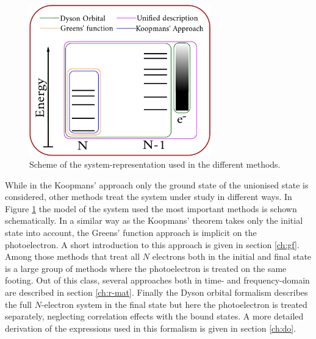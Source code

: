 {\begin{figure}
   \includegraphics[width=0.7\textwidth]{Figures/Methods}
   \caption{Scheme of the system-representation used in the different methods.}
   \label{fig:PEScat}
\end{figure}
While in the Koopmans' approach only the ground state of the un\-ion\-ised state is considered, other methods treat the system under study in different ways.
In Figure \ref{fig:PEScat} the model of the system used the most important methods is schown schematically.
In a similar way as the Koopmans' theorem takes only the initial state into account, the Greens' function approach is implicit on the photoelectron.
A short introduction to this approach is given in section \ref{ch:gf}.
Among those methods that treat all $N$ electrons both in the initial and final state is a large group of methods where the photoelectron is treated on the same footing.
Out of this class, several approaches both in time- and frequency-domain are described in section \ref{ch:r-mat}.
Finally the Dyson orbital formalism describes the full $N$-electron system in the final state but here the photoelectron is treated separately, neglecting correlation effects with the bound states.
A more detailed derivation of the expressions used in this formalism is given in section \ref{ch:do}.

}

